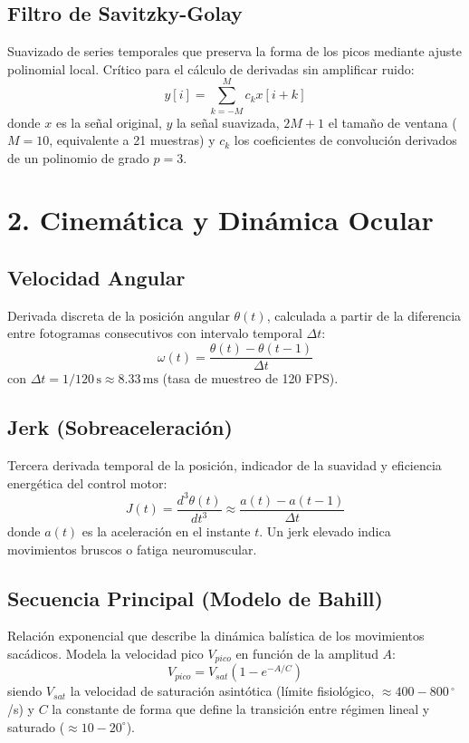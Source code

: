 \subsection*{Filtro de Savitzky-Golay}
Suavizado de series temporales que preserva la forma de los picos mediante ajuste polinomial local. Crítico para el cálculo de derivadas sin amplificar ruido:
\begin{equation}
	y[i] = \sum_{k=-M}^{M} c_k x[i+k]
	\label{eq:anexo_savgol}
\end{equation}
donde $x$ es la señal original, $y$ la señal suavizada, $2M+1$ el tamaño de ventana ($M=10$, equivalente a 21 muestras) y $c_k$ los coeficientes de convolución derivados de un polinomio de grado $p=3$.


\section*{2. Cinemática y Dinámica Ocular}

\subsection*{Velocidad Angular}
Derivada discreta de la posición angular $\theta(t)$, calculada a partir de la diferencia entre fotogramas consecutivos con intervalo temporal $\Delta t$:
\begin{equation}
	\omega(t) = \frac{\theta(t) - \theta(t-1)}{\Delta t}
	\label{eq:anexo_velocidad}
\end{equation}
con $\Delta t = 1/120\,\text{s} \approx 8.33\,\text{ms}$ (tasa de muestreo de 120 FPS).

\subsection*{Jerk (Sobreaceleración)}
Tercera derivada temporal de la posición, indicador de la suavidad y eficiencia energética del control motor:
\begin{equation}
	J(t) = \frac{d^3 \theta(t)}{dt^3} \approx \frac{a(t) - a(t-1)}{\Delta t}
	\label{eq:anexo_jerk}
\end{equation}
donde $a(t)$ es la aceleración en el instante $t$. Un jerk elevado indica movimientos bruscos o fatiga neuromuscular.

\subsection*{Secuencia Principal (Modelo de Bahill)}
Relación exponencial que describe la dinámica balística de los movimientos sacádicos. Modela la velocidad pico $V_{pico}$ en función de la amplitud $A$:
\begin{equation}
	V_{pico} = V_{sat} \left(1 - e^{-A/C}\right)
	\label{eq:anexo_mainseq}
\end{equation}
siendo $V_{sat}$ la velocidad de saturación asintótica (límite fisiológico, $\approx 400-800\,^\circ$/s) y $C$ la constante de forma que define la transición entre régimen lineal y saturado ($\approx 10-20^\circ$).


